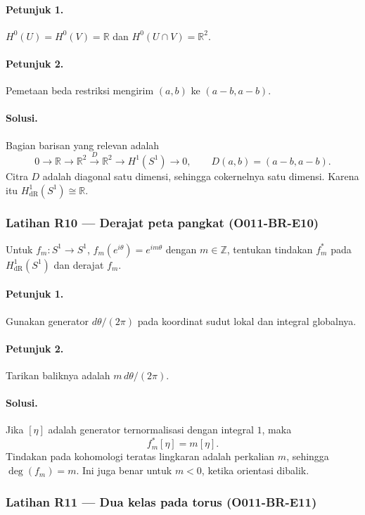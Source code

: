 \paragraph{Petunjuk 1.}
$H^0(U)=H^0(V)=\mathbb R$ dan
$H^0(U\cap V)=\mathbb R^2$.

\paragraph{Petunjuk 2.}
Pemetaan beda restriksi mengirim $(a,b)$ ke $(a-b,a-b)$.

\paragraph{Solusi.}
Bagian barisan yang relevan adalah
\[
0\to\mathbb R\to\mathbb R^2
\xrightarrow{D}\mathbb R^2
\to H^1(S^1)\to0,
\qquad D(a,b)=(a-b,a-b).
\]
Citra $D$ adalah diagonal satu dimensi, sehingga cokernelnya satu dimensi.
Karena itu $H^1_{\mathrm{dR}}(S^1)\cong\mathbb R$.

\subsubsection*{Latihan R10 — Derajat peta pangkat (O011-BR-E10)}
\label{o011-br-e10}

Untuk $f_m\colon S^1\to S^1$, $f_m(e^{i\theta})=e^{im\theta}$ dengan
$m\in\mathbb Z$, tentukan tindakan $f_m^*$ pada $H^1_{\mathrm{dR}}(S^1)$ dan
derajat $f_m$.

\paragraph{Petunjuk 1.}
Gunakan generator $d\theta/(2\pi)$ pada koordinat sudut lokal dan integral
globalnya.

\paragraph{Petunjuk 2.}
Tarikan baliknya adalah $m\,d\theta/(2\pi)$.

\paragraph{Solusi.}
Jika $[\eta]$ adalah generator ternormalisasi dengan integral $1$, maka
\[
 f_m^*[\eta]=m[\eta].
\]
Tindakan pada kohomologi teratas lingkaran adalah perkalian $m$, sehingga
$\deg(f_m)=m$. Ini juga benar untuk $m<0$, ketika orientasi dibalik.

\subsubsection*{Latihan R11 — Dua kelas pada torus (O011-BR-E11)}
\label{o011-br-e11}

